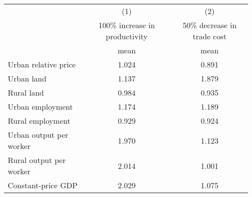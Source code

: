 {
\def\sym#1{\ifmmode^{#1}\else\(^{#1}\)\fi}
\begin{tabular}{l*{2}{c}}
\hline\hline
                    &\multicolumn{1}{c}{(1)}&\multicolumn{1}{c}{(2)}\\
                    &100\% increase in productivity&50\% decrease in trade cost\\
                    &        mean&        mean\\
\hline
Urban relative price&       1.024&       0.891\\
Urban land          &       1.137&       1.879\\
Rural land          &       0.984&       0.935\\
Urban employment    &       1.174&       1.189\\
Rural employment    &       0.929&       0.924\\
Urban output per worker&       1.970&       1.123\\
Rural output per worker&       2.014&       1.001\\
Constant-price GDP  &       2.029&       1.075\\
\hline\hline
\end{tabular}
}
